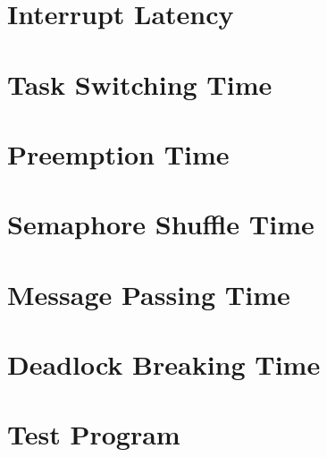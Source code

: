 \section{Interrupt Latency}
\section{Task Switching Time}
\section{Preemption Time}
\section{Semaphore Shuffle Time}
\section{Message Passing Time}
\section{Deadlock Breaking Time}
\section{Test Program}
